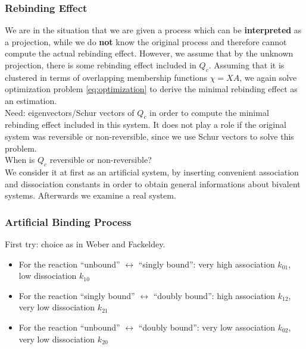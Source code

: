 \subsubsection*{Rebinding Effect}

We are in the situation that we are given a process which can be \textbf{interpreted} as a projection, while we do \textbf{not} know the original process and therefore cannot compute the actual rebinding effect.
However, we assume that by the unknown projection, there is some rebinding effect included in $Q_c$.
Assuming that it is clustered in terms of overlapping membership functions $\chi = XA$, we again solve optimization problem \eqref{eq:optimization} to derive the minimal rebinding effect as an estimation. 
\\

Need: eigenvectors/Schur vectors of $Q_c$ in order to compute the minimal rebinding effect included in this system.
It does not play a role if the original system was reversible or non-reversible, since we use Schur vectors to solve this problem.
\\

When is $Q_c$ reversible or non-reversible?
\\

We consider it at first as an artificial system, by inserting convenient association and dissociation constants in order to obtain general informations about bivalent systems. Afterwards we examine a real system.
\subsubsection*{Artificial Binding Process}

First try: choice as in Weber and Fackeldey\cite{weber2014}.
\begin{itemize}
	\item For the reaction ``unbound'' $\leftrightarrow$ ``singly bound'': very high association $k_{01}$, low dissociation $k_{10}$
	\item For the reaction ``singly bound'' $\leftrightarrow$ ``doubly bound'': high association $k_{12}$, very low dissociation $k_{21}$
	\item For the reaction ``unbound'' $\leftrightarrow$ ``doubly bound'': very low association $k_{02}$, very low dissociation $k_{20}$
\end{itemize}

